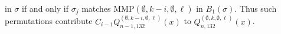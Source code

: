 \documentclass[
final,nomarks
]{dmtcs-episciences}
\newcommand{\Qmmn}[2]{Q_{#2,132}^{(#1)}(x)}
\newcommand{\MMP}{\mathrm{MMP}}
\begin{document}
\begin{enumerate}[{\bf Case }\bf 1.]
	in \begin{math}\sigma\end{math} if and only if \begin{math}\sigma_j\end{math}  matches \begin{math}\MMP(\emptyset,k-i,\emptyset,\ell)\end{math} 
	in \begin{math}B_1(\sigma)\end{math}. Thus such permutations contribute \begin{math}C_{i-1}\Qmmn{\emptyset,k-i,\emptyset,\ell}{n-1}\end{math} to 
	\begin{math}\Qmmn{\emptyset,k,\emptyset,\ell}{n}\end{math}.
	

\end{enumerate}
\end{document}
